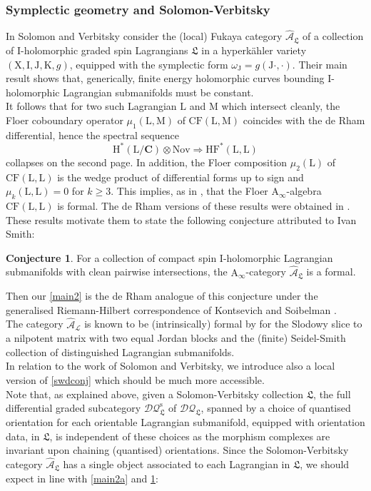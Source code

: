 \documentclass{article}
\theoremstyle{plain}
\theoremstyle{definition}
\newtheorem{conjecture}[theorem]{Conjecture}
\theoremstyle{remark}
\newcommand{\mr}{\mathrm}
\newcommand{\Aa}{\mr{A}_{\infty}}
\newcommand{\C}{\mathbf C}
\newcommand{\3}{\vspace{3mm}}
\newcommand{\2}{\vspace{2mm}}
\newcommand{\1}{\vspace{1mm}}
\begin{document}
\subsubsection{Symplectic geometry and Solomon-Verbitsky}In \cite{solomon_verbitsky_2019} Solomon and Verbitsky consider the (local) Fukaya category $\widehat{\mathcal{A}}_\mathfrak{L}$ of a collection of $\mr{I}$-holomorphic graded spin Lagrangians $\mathfrak{L}$ in a hyperkähler variety $(\mr{X},\mr{I,J,K},g)$, equipped with the symplectic form $\omega_\mr{J}=g(\mr{J}\cdot,\cdot)$. Their main result shows that, generically, finite energy holomorphic curves bounding $\mr{I}$-holomorphic Lagrangian submanifolds must be constant.\\
It follows that for two such Lagrangian $\mr{L}$ and $\mr{M}$ which intersect cleanly, the Floer coboundary operator $\mu_1(\mr{L,M})$ of $\mr{CF}(\mr{L,M})$ coincides with the de Rham differential, hence the spectral sequence $$\mr{H}^{*}(\mr{L}/\C)\otimes \mr{Nov} \Rightarrow \mr{HF}^{*}(\mr{L,L})$$ collapses on the second page. In addition, the Floer composition $\mu_2(\mr{L})$ of $\mr{CF}(\mr{L,L})$ is the wedge product of differential forms up to sign and $\mu_k(\mr{L,L})=0$ for $k \ge 3$. This implies, as in \cite{Deligne1975}, that the Floer $\Aa$-algebra $\mr{CF}(\mr{L},\mr{L})$ is formal. The de Rham versions of these results were obtained in \cite{MR4678893}.\\
These results motivate them to state the following conjecture attributed to Ivan Smith:
\2
\begin{conjecture}\label{ivanformality}
For a collection of compact spin $\mr{I}$-holomorphic Lagrangian submanifolds with clean pairwise intersections, the $\Aa$-category $\widehat{\mathcal{A}}_\mathfrak{L}$ is a formal.
\end{conjecture}
Then our \cref{main2} is the de Rham analogue of this conjecture under the generalised Riemann-Hilbert correspondence of Kontsevich and Soibelman \cite{hft}.\\
The category $\widehat{\mathcal{A}}_\mathcal{L}$ is known to be (intrinsically) formal by \cite{MR3486414} for the Slodowy slice to a nilpotent matrix with two equal Jordan blocks and the (finite) Seidel-Smith collection of distinguished Lagrangian submanifolds.\\
In relation to the work of Solomon and Verbitsky, we introduce also a local version of \cref{swdconj} which should be much more accessible.\\
Note that, as explained above, given a Solomon-Verbitsky collection $\mathfrak{L}$, the full differential graded subcategory $\mathcal{DQ}_\mathfrak{L}^{\mr{s}}$ of $\mathcal{DQ}_\mathfrak{L}$, spanned by a choice of quantised orientation for each orientable Lagrangian submanifold, equipped with orientation data, in $\mathfrak{L}$, is independent of these choices as the morphism complexes are invariant upon chaining (quantised) orientations. Since the Solomon-Verbitsky category $\widehat{\mathcal{A}}_\mathfrak{L}$ has a single object associated to each Lagrangian in $\mathfrak{L}$, we should expect in line with \cref{main2a} and \cref{ivanformality}: 
\end{document}
